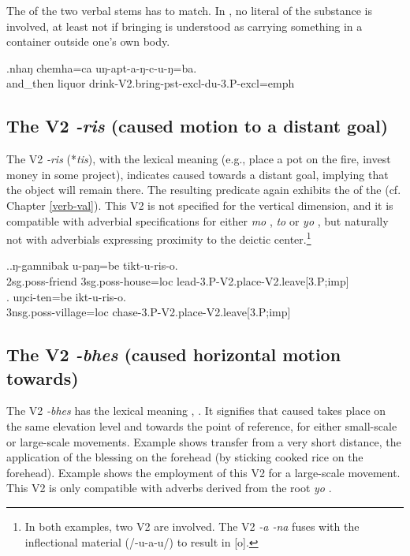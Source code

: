 The  of the two verbal stems has to match. In \Next, no literal  of the substance is involved, at least not if bringing is understood as carrying something in a container outside one's own body.

\exg.nhaŋ chemha=ca uŋ-apt-a-ŋ-c-u-ŋ=ba.\\
and\_then liquor  drink{\sc -V2.bring-pst-excl-du-3.P-excl=emph}\\


\subsection{The V2 \emph{-ris} (caused motion to a distant goal)}\label{V2-place}%
\largerpage
The V2 \emph{-ris} (*\emph{tis}), with the lexical meaning  (e.g., place a pot on the fire, invest money in some project),  indicates caused  towards a distant goal, implying that the object will remain there. The resulting predicate again exhibits  the  of the  (cf. Chapter \ref{verb-val}). This V2 is not specified for the vertical dimension, and it is compatible with adverbial specifications for either \emph{mo} , \emph{to}  or \emph{yo} , but naturally not with adverbials expressing proximity to the deictic center.\footnote{In both examples, two V2 are involved. The V2 \emph{-a \ti -na}  fuses with the inflectional material (/-u-a-u/) to result in [o].}

\ex.\ag.ŋ-gamnibak  u-paŋ=be tikt-u-ris-o.\\
{\sc 2sg.poss-}friend {\sc 3sg.poss-}house{\sc =loc}  lead{\sc -3.P-V2.place-V2.leave[3.P;imp]}\\
\bg. uŋci-ten=be ikt-u-ris-o.\\
{\sc 3nsg.poss-}village{\sc =loc} chase{\sc -3.P-V2.place-V2.leave[3.P;imp]}\\
 

\subsection{The V2 \emph{-bhes} (caused horizontal motion towards)} \label{V2-bhes}%

The V2 \emph{-bhes}  has the lexical meaning , . It signifies that  caused  takes place on the same elevation  level and towards the point of reference, for either  small-scale or large-scale movements.  Example \Next[a] shows  transfer from a very short distance, the application of the blessing on the forehead (by sticking cooked rice on the forehead). Example \Next[b] shows the employment of this V2 for a large-scale movement. This V2 is only compatible with adverbs derived from the root \emph{yo} . 


